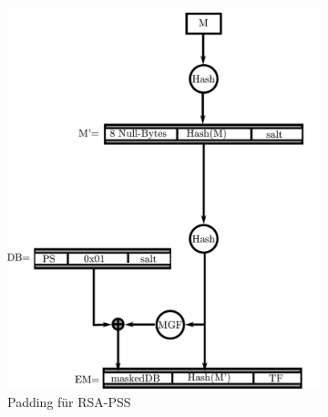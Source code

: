 \begin{figure}[h]
  \centering
  \begin{subfigure}[b]{.45\textwidth}
    \includegraphics[width=\textwidth]{images/pss.pdf}
    \caption{Padding für RSA-PSS}
    \label{fig:pss}
  \end{subfigure}
  \begin{subfigure}[b]{.45\textwidth}

\end{subfigure}
\end{figure}
